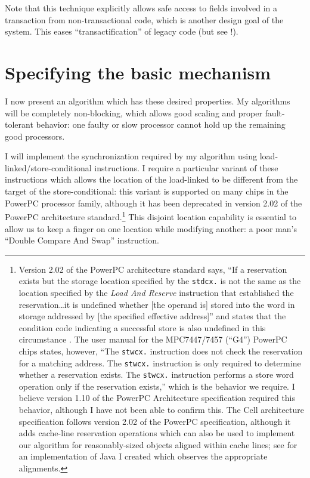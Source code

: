 Note that this technique explicitly allows safe access to fields
involved in a transaction from non-transactional code, which is
another design goal of the system.  This eases ``transactification''
of legacy code (but see !).

\section{Specifying the basic mechanism}
I now present an algorithm which has these desired properties.
My algorithms will be completely non-blocking, which allows good
scaling and proper fault-tolerant behavior: one faulty or slow
processor cannot hold up the remaining good processors.

I will implement the synchronization required by my algorithm using
load-linked/store-conditional instructions.  I require a particular
variant of these instructions which allows the location of the
load-linked to be different from the target of the store-conditional:
this variant is supported on many chips in the PowerPC processor family,
although it has been deprecated in version 2.02 of the PowerPC
architecture standard.\footnote{Version 2.02 of the PowerPC
architecture standard says, ``If a reservation exists but the storage
location specified by the \texttt{stdcx.} is not the same as the
location specified by the \textit{Load And Reserve} instruction that
established the reservation\ldots it is undefined whether [the operand
is] stored into the word in storage addressed by [the specified
effective address]'' and states that the condition code indicating a
successful store is also undefined in this circumstance \cite[p 25]{PPCII202}.
The user manual for the MPC7447/7457 (``G4'') PowerPC chips states,
however, ``The \texttt{stwcx.} instruction does not check the
reservation for a matching address.  The \texttt{stwcx.} instruction
is only required to determine whether a reservation exists.  The
\texttt{stwcx.} instruction performs a store word operation only if
the reservation exists,'' \cite[Chapter 3.3.3.6]{MPC7450UM} which is
the behavior we require.  I believe version 1.10 of the PowerPC
Architecture specification required this behavior, although I have not
been able to confirm this.  The Cell architecture specification
follows version 2.02 of the PowerPC specification, although it adds
cache-line reservation operations which can also be used to
implement our algorithm for reasonably-sized objects aligned within
cache lines; see \cite{WitchelLaAnAs01} for an implementation of Java
I created which observes the appropriate alignments.}  This disjoint location
capability is essential to allow us to keep a finger on one location
while modifying another: a poor man's ``Double Compare And Swap''
instruction.


